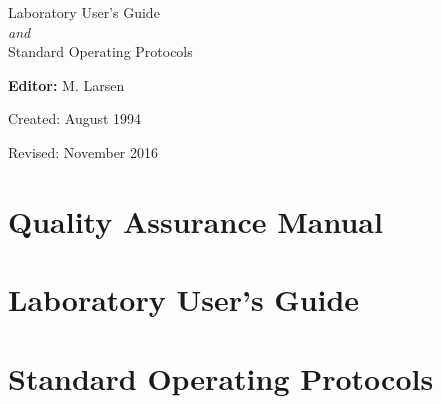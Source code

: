 \documentclass{WSLsop}
\begin{document}
\hfill
\vspace{50mm}
		
\centering
\Huge{Laboratory User's Guide \\ \normalfont\textit{and} \\ Standard Operating Protocols}
\vspace{15mm}
		
\normalsize\textbf{Editor:} M. Larsen
		
\vspace{15mm}
Created: August 1994
		
Revised: November 2016
		
\contact{}
			
\clearpage
\tableofcontents
\clearpage

\part{Quality Assurance Manual}

\part{Laboratory User's Guide}


\part{Standard Operating Protocols}

\end{document}
